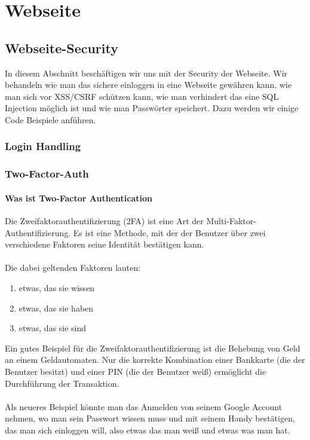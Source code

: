 \renewcommand{\theauthor}{Marcel Stering}
\chapter{Webseite}
\label{sec:Webseite}
\section{Webseite-Security}
\label{sec:Security}
In diesem Abschnitt beschäftigen wir uns mit der Security der Webseite.
Wir behandeln wie man das sichere einloggen in eine Webseite gewähren kann, 
wie man sich vor XSS/CSRF schützen kann, wie man verhindert das eine SQL Injection
möglich ist und wie man Passwörter speichert. Dazu werden wir einige Code Beispiele anführen.

\subsection{Login Handling}
\label{sec:Login}
\subsection{Two-Factor-Auth}
\label{sec:tfa}
\subsubsection{Was ist Two-Factor Authentication}
Die Zweifaktorauthentifizierung (2FA) ist eine Art der Multi-Faktor-Authentifizierung. Es ist eine Methode, mit der der Benutzer über zwei verschiedene Faktoren seine Identität bestätigen kann.\\ \\
Die dabei geltenden Faktoren lauten:
\begin{enumerate}
\item etwas, das sie wissen
\item etwas, das sie haben
\item etwas, das sie sind
\end{enumerate}
Ein gutes Beispiel für die Zweifaktorauthentifizierung ist die Behebung von Geld an einem Geldautomaten. Nur die korrekte Kombination einer Bankkarte (die der Benutzer besitzt) und einer PIN (die der Benutzer weiß) ermöglicht die Durchführung der Transaktion.\\ \\Als neueres Beispiel könnte man das Anmelden von seinem Google Account nehmen, wo man sein Passwort wissen muss und mit seinem Handy bestätigen, das man sich einloggen will, also etwas das man weiß und etwas was man hat. 

